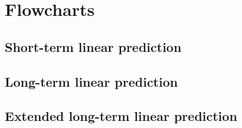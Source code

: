 
\chapter{Flowcharts}

\section{Short-term linear prediction}

\section{Long-term linear prediction}

\section{Extended long-term linear prediction}
